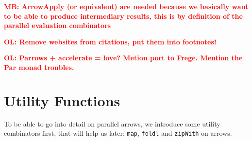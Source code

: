 \documentclass{jfp1}
\newcommand{\inlinecode}[1]{\texttt{#1}}
\newcommand{\comm}[2]{\textcolor{red}{\bfseries #1: #2}}
\newcommand{\olcomment}[1]{\comm{OL}{#1}}
\newcommand{\mbcomment}[1]{\comm{MB}{#1}}
\begin{document}
\mbcomment{ArrowApply (or equivalent) are needed because we basically want to be able to produce intermediary results, this is by definition of the parallel evaluation combinators}

\olcomment{Remove websites from citations, put them into footnotes!}

\olcomment{Parrows + accelerate = love? Metion port to Frege. Mention the Par monad troubles.}
        
	
        \appendix
	\section{Utility Functions}\label{utilfns}
To be able to go into detail on parallel arrows, we introduce some utility combinators first, that will help us later: \inlinecode{map}, \inlinecode{foldl} and \inlinecode{zipWith} on arrows.
\end{document}
